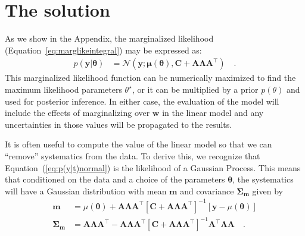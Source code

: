 \documentclass[modern]{rnaastex}
\renewcommand{\eqref}[1]{\ref{eq:#1}}
\newcommand{\Eq}[1]{Equation~(\eqref{#1})}
\newcommand{\eq}[1]{\Eq{#1}}
\newcommand{\eqalt}[1]{Equation~\eqref{#1}}
\newcommand{\eqlabel}[1]{\label{eq:#1}}
\newcommand{\bvec}[1]{{\ensuremath{\boldsymbol{#1}}}}
\newcommand{\Normal}{\ensuremath{\mathcal{N}}}
\newcommand{\mA}{\ensuremath{\bvec{A}}}
\newcommand{\mC}{\ensuremath{\bvec{C}}}
\newcommand{\mL}{\ensuremath{\bvec{\Lambda}}}
\newcommand{\vy}{\ensuremath{\bvec{y}}}
\newcommand{\vt}{\ensuremath{\bvec{\theta}}}
\newcommand{\vm}{\ensuremath{\bvec{\mu}(\bvec{\theta})}}
\begin{document}
\section{The solution}

As we show in the Appendix, the marginalized likelihood 
(\eqalt{marglikeintegral}) may be expressed as:
%
\begin{align}
\eqlabel{p(y|t)normal}
p(\vy | \vt) &= \Normal (\vy; \vm, \mC + \mA \mL \mA^\top) \quad.
\end{align}
%
This marginalized likelihood function can be numerically maximized to find the
maximum likelihood parameters $\theta^\star$, or it can be
multiplied by a prior $p(\theta)$ and used for posterior inference.
In either case, the evaluation of the model will include the effects of
marginalizing over $\bvec{w}$ in the linear model and any uncertainties in
those values will be propagated to the results.

It is often useful to compute the value of the linear model so that we can
``remove'' systematics from the data.
To derive this, we recognize that \eq{p(y|t)normal} is the likelihood of a
Gaussian Process.
This means that conditioned on the data and a choice of the parameters
$\bvec{\theta}$, the systematics will have a Gaussian distribution with mean
$\bvec{m}$ and covariance $\bvec{\Sigma}_\bvec{m}$ given by
\citep{Rasmussen:2006}
%
\begin{align}\eqlabel{pred}
\bvec{m} &= \mu(\bvec{\theta}) + \mA \mL \mA^\top  \left[\mC +
    \mA \mL \mA^\top\right]^{-1} \left[\bvec{y} - \mu(\bvec{\theta})\right]
    \nonumber\\
\bvec{\Sigma}_\bvec{m} &= \mA \mL \mA^\top - \mA \mL \mA^\top
    \left[\mC + \mA \mL \mA^\top\right]^{-1}
    \mA^\top \mL \mA \quad.
\end{align}
\end{document}
